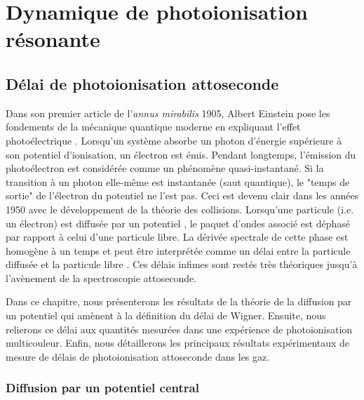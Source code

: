 \part{Dynamique de photoionisation résonante}
\label{part:Delais}
\chapter{Délai de photoionisation attoseconde}
\label{chap:DelaiPI}
Dans son premier article de l'\textit{annus mirabilis} 1905, Albert Einstein pose les fondements de la mécanique quantique moderne en expliquant l'effet photoélectrique . Lorsqu'un système absorbe un photon d'énergie supérieure à son potentiel d'ionisation, un électron est émis. Pendant longtemps, l'émission du photoélectron est considérée comme un phénomène quasi-instantané. Si la transition à un photon  elle-même est instantanée (saut quantique), le "temps de sortie" de l'électron du potentiel ne l'est pas. Ceci est devenu clair dans les années 1950 avec le développement de la théorie des collisions. Lorsqu'une particule (i.e. un électron) est diffusée par un potentiel , le paquet d'ondes associé est déphasé par rapport à celui d'une particule libre. La dérivée spectrale de cette phase est homogène à un temps et peut être interprétée comme un délai entre la particule diffusée et la particule libre . Ces délais infimes sont restés très théoriques jusqu'à l'avènement de la spectroscopie attoseconde.

Dans ce chapitre, nous présenterons les résultats de la théorie de la diffusion par un potentiel qui amènent à la définition du délai de Wigner. Ensuite, nous relierons ce délai aux quantités mesurées dans une expérience de photoionisation multicouleur. Enfin, nous détaillerons les principaux résultats expérimentaux de mesure de délais de photoionisation attoseconde dans les gaz.

\section{Diffusion par un potentiel central}
\label{sec:DiffusionPotentielCentral}
